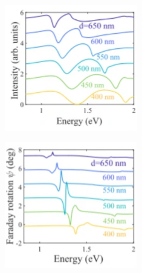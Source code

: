 \documentclass[13pt]{article}
\begin{document}
\begin{figure}[hbt]
	\centering
	\begin{subfigure}[]{.49\linewidth}
		\centering
		\includegraphics[width=\linewidth]{Figures/figure4a.png}
		\caption{}
		\label{fig:figure4a}
	\end{subfigure}
	\hfill
	\begin{subfigure}[]{.49\linewidth}
		\centering
		\includegraphics[width=\linewidth]{Figures/figure4b.png}
		\caption{}
		\label{fig:figure4b}
	\end{subfigure}
	

\end{figure}
\end{document}
